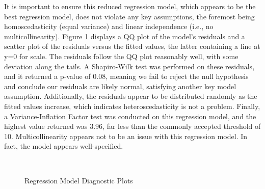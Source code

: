 \documentclass{article}
\begin{document}
It is important to ensure this reduced regression model, which appears to be the best regression model, does not violate any key assumptions, the foremost being homoscedasticity (equal variance) and linear independence (i.e., no multicollinearity). Figure \ref{model_diags} displays a QQ plot of the model's residuals and a scatter plot of the residuals versus the fitted values, the latter containing a line at y=0 for scale. The residuals follow the QQ plot reasonably well, with some deviation along the tails. A Shapiro-Wilk test was performed on these residuals, and it returned a p-value of 0.08, meaning we fail to reject the null hypothesis and conclude our residuals are likely normal, satisfying another key model assumption. Additionally, the residuals appear to be distributed randomly as the fitted values increase, which indicates heteroscedasticity is not a problem. Finally, a Variance-Inflation Factor test was conducted on this regression model, and the highest value returned was 3.96, far less than the commonly accepted threshold of 10. Multicollinearity appears not to be an issue with this regression model. In fact, the model appears well-specified.

\begin{figure}[H]
    \centering
    \\
    \caption{Regression Model Diagnostic Plots}
    \label{model_diags}
\end{figure}
\end{document}
